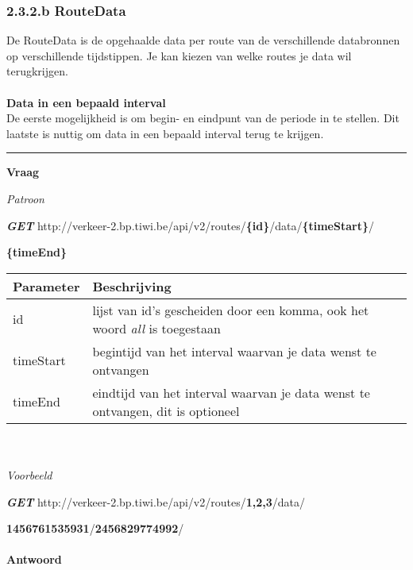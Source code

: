 \documentclass[ps,a4paper,oneside]{report}
\begin{document}
\subsubsection{2.3.2.b RouteData}
De RouteData is de opgehaalde data per route van de verschillende databronnen op verschillende tijdstippen. Je kan kiezen van welke routes je data wil terugkrijgen.\\\\
\textbf{Data in een bepaald interval}\\
De eerste mogelijkheid is om begin- en eindpunt van de periode in te stellen. Dit laatste is nuttig om data in een bepaald interval terug te krijgen.\\
\noindent\rule[0.5ex]{\linewidth}{1pt}
\textbf{Vraag}

\textit{Patroon}

\textbf{\textit{GET}}
 http://verkeer-2.bp.tiwi.be/api/v2/routes/\textbf{\{id\}}/data/\textbf{\{timeStart\}}/
 
 \textbf{\{timeEnd\}}\\
 
 \begin{tabular}{ | l | p{8.5 cm}| }
 	\hline
 	\textbf{Parameter} & \textbf{Beschrijving}\\
 	\hline
 	id & lijst van id's gescheiden door een komma, ook het woord \textit{all} is toegestaan\\
 	\hline
 	timeStart & begintijd van het interval waarvan je data wenst te ontvangen\\
 	\hline
 	timeEnd & eindtijd van het interval waarvan je data wenst te ontvangen, dit is optioneel\\
 	\hline
 \end{tabular}\\\\
 
\textit{Voorbeeld}

\textbf{\textit{GET}}
 http://verkeer-2.bp.tiwi.be/api/v2/routes/\textbf{1,2,3}/data/
 
 \textbf{1456761535931}/\textbf{2456829774992}/\\\\ 
\textbf{Antwoord}
\end{document}
